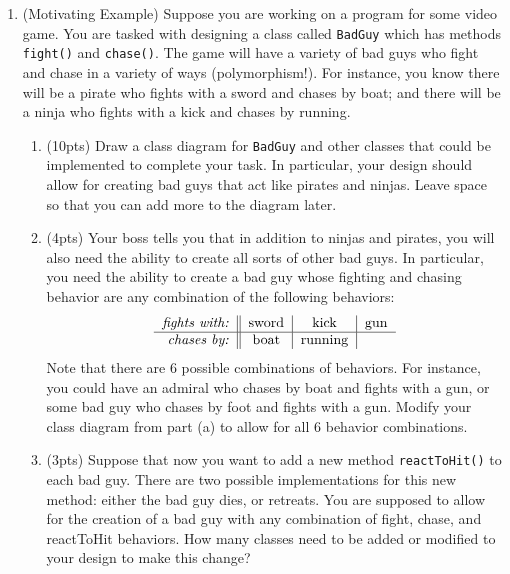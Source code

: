 \documentclass[11pt]{article}
\newlength{\up}\setlength{\up}{-\baselineskip}
\begin{document}
\begin{enumerate}

  \item (Motivating Example) Suppose you are working on a program for some video game. You are tasked with designing a class called \texttt{BadGuy} which has methods \texttt{fight()} and \texttt{chase()}. The game will have a variety of bad guys who fight and chase in a variety of ways (polymorphism!). For instance, you know there will be a pirate who fights with a sword and chases by boat; and there will be a ninja who fights with a kick and chases by running. 

  \begin{enumerate}

    \item (10pts) Draw a class diagram for \texttt{BadGuy} and other classes that could be implemented to complete your task. In particular, your design should allow for creating bad guys that act like pirates and ninjas. Leave space so that you can add more to the diagram later.

    \vfill

\newpage

    \item (4pts) Your boss tells you that in addition to ninjas and pirates, you will also need the ability to create all sorts of other bad guys. In particular, you need the ability to create a bad guy whose fighting and chasing behavior are any combination of the following behaviors:
    \[
      \begin{tabular}{r||c|c|c}
        \emph{fights with:} & sword & kick    & gun \\\hline
        \emph{chases by:}   & boat  & running &  
      \end{tabular}
    \]
    Note that there are 6 possible combinations of behaviors. For instance, you could have an admiral who chases by boat and fights with a gun, or some bad guy who chases by foot and fights with a gun. Modify your class diagram from part (a) to allow for all 6 behavior combinations.

    \item (3pts) Suppose that now you want to add a new method \texttt{reactToHit()} to each bad guy. There are two possible implementations for this new method: either the bad guy dies, or retreats. You are supposed to allow for the creation of a bad guy with any combination of fight, chase, and reactToHit behaviors. How many classes need to be added or modified to your design to make this change?


\end{enumerate}
\end{enumerate}
\end{document}
